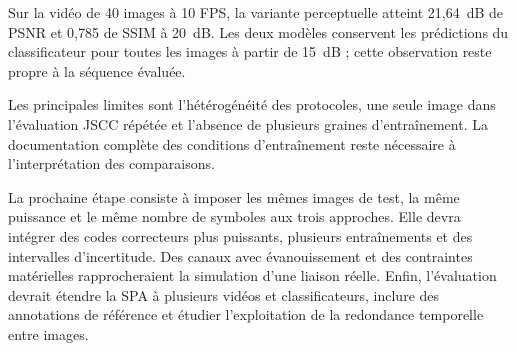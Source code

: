 \documentclass[conference]{IEEEtran}
\begin{document}
Sur la vidéo de 40 images à 10 FPS, la variante perceptuelle atteint
21,64~dB de PSNR et 0,785 de SSIM à 20~dB. Les deux modèles
conservent les prédictions du classificateur pour toutes les images
à partir de 15~dB ; cette observation reste propre à la séquence évaluée.

Les principales limites sont l'hétérogénéité des protocoles, une
seule image dans l'évaluation JSCC répétée et l'absence de plusieurs
graines d'entraînement. La documentation complète des conditions
d'entraînement reste nécessaire à l'interprétation des comparaisons.

La prochaine étape consiste à imposer les mêmes images de test,
la même puissance et le même nombre de symboles aux trois
approches. Elle devra intégrer des codes correcteurs plus puissants,
plusieurs entraînements et des intervalles d'incertitude. Des canaux
avec évanouissement et des contraintes matérielles rapprocheraient
la simulation d'une liaison réelle. Enfin, l'évaluation devrait étendre la SPA à plusieurs vidéos et
classificateurs, inclure des annotations de référence et étudier
l'exploitation de la redondance temporelle entre images.



\end{document}
